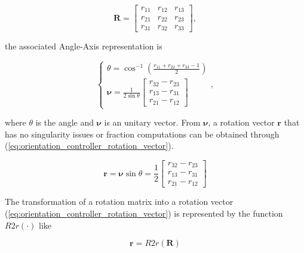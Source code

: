 \begin{equation}
    \label{eq:orientation_controller_rotation_matrix}
    \boldsymbol{R} = \begin{bmatrix} 
    r_{11} & r_{12} & r_{13}\\
    r_{21} & r_{22} & r_{23}\\
    r_{31} & r_{32} & r_{33}
    \end{bmatrix},
\end{equation}

the associated Angle-Axis representation is

\begin{equation}
    \label{eq:orientation_controller_angle_axis}
    \begin{cases}
        \theta = \cos^{-1}\left({\frac{r_{11}+r_{22}+r_{33}-1}{2}} \right)\\
        \boldsymbol{\nu} = \frac{1}{2\sin{\theta}} \begin{bmatrix}
        r_{32} - r_{23}\\
        r_{13} - r_{31}\\
        r_{21} - r_{12}
        \end{bmatrix}
    \end{cases},
\end{equation}

where $\theta$ is the angle and $\boldsymbol{\nu}$ is an unitary vector. From $\boldsymbol{\nu}$, a rotation vector $\boldsymbol{r}$ that has no singularity issues or fraction computations can be obtained through (\ref{eq:orientation_controller_rotation_vector}).

\begin{equation}
    \label{eq:orientation_controller_rotation_vector}
    \boldsymbol{r} = \boldsymbol{\nu} \sin{\theta} = \frac{1}{2} \begin{bmatrix}
        r_{32} - r_{23}\\
        r_{13} - r_{31}\\
        r_{21} - r_{12}
        \end{bmatrix}
\end{equation}

The transformation of a rotation matrix into a rotation vector (\ref{eq:orientation_controller_rotation_vector}) is represented by the function $R2r(\cdot)$ like

\begin{equation}
    \boldsymbol{r} = R2r(\boldsymbol{R})
\end{equation}

